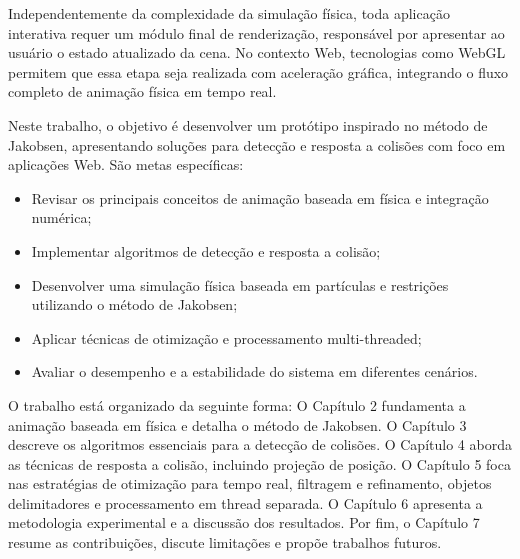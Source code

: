 Independentemente da complexidade da simulação física, toda aplicação interativa requer um módulo final de renderização, responsável por apresentar ao usuário o estado atualizado da cena. No contexto Web, tecnologias como WebGL permitem que essa etapa seja realizada com aceleração gráfica, integrando o fluxo completo de animação física em tempo real.

Neste trabalho, o objetivo é desenvolver um protótipo inspirado no método de Jakobsen, apresentando soluções para detecção e resposta a colisões com foco em aplicações Web. São metas específicas:
\begin{itemize}
	\item Revisar os principais conceitos de animação baseada em física e integração numérica;
	\item Implementar algoritmos de detecção e resposta a colisão;
	\item Desenvolver uma simulação física baseada em partículas e restrições utilizando o método de Jakobsen;
	\item Aplicar técnicas de otimização e processamento multi-threaded;
	\item Avaliar o desempenho e a estabilidade do sistema em diferentes cenários.
\end{itemize}

O trabalho está organizado da seguinte forma: O Capítulo 2 fundamenta a animação baseada em física e detalha o método de Jakobsen. O Capítulo 3 descreve os algoritmos essenciais para a detecção de colisões. O Capítulo 4 aborda as técnicas de resposta a colisão, incluindo projeção de posição. O Capítulo 5 foca nas estratégias de otimização para tempo real, filtragem e refinamento, objetos delimitadores e processamento em thread separada. O Capítulo 6 apresenta a metodologia experimental e a discussão dos resultados. Por fim, o Capítulo 7 resume as contribuições, discute limitações e propõe trabalhos futuros.
